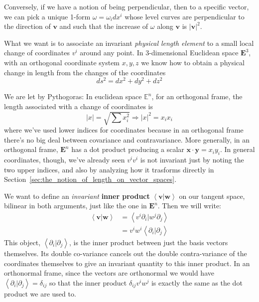 \documentclass[../master.tex]{subfiles}
\begin{document}
	Conversely, if we have a notion of being perpendicular, then to a specific vector, we can pick a unique 1-form $\omega = \omega_i dx^i$ whose level curves are perpendicular to the direction of $\mathbf v$ and such that the increase of $\omega$ along $\mathbf v$ is $|\mathbf v|^2$.
	
	What we want is to associate an invariant \emph{physical length element} to a small local change of coordinates $v^i$ around any point. In 3-dimensional Euclidean space $\mathbf E^3$, with an orthogonal coordinate system $x,y,z$ we know how to obtain a physical change in length from the changes of the coordinates
	\begin{equation}
		ds^2 = dx^2 + dy^2 + dz^2
	\end{equation}
	
	
	
	We are let by Pythogoras: In euclidean space $\mathbb E^n$, for an orthogonal frame, the length associated with a change of coordinates is 
	\begin{equation}
		|x| = \sqrt{\sum x_i^2} \Rightarrow |x|^2 = x_i x_i
	\end{equation}
	where we've used lower indices for coordinates because in an orthogonal frame there's no big deal between covariance and contravariance. More generally, in an orthogonal frame, $\mathbf E^n$ has a dot product producing a scalar $\mathbf x \cdot \mathbf y = x_i y_i$. 
	In general coordinates, though, we've already seen $v^i v^i$ is not invariant just by noting the two upper indices, and also by analyzing how it trasforms directly in Section~\ref{sec:the_notion_of_length_on_vector_spaces}. 
	
	We want to define an \emph{invariant} \textbf{inner product} $\left< \mathbf v | \mathbf w \right>$ on our tangent space, bilinear in both arguments, just like the one in $\mathbf E^n$. Then we will write:
	\begin{equation}
		\begin{aligned}
			\left< \mathbf v | \mathbf w \right> &= \left< v^i \partial_i | w^j \partial_j \right> \\
			&= v^i w^i \left< \partial_i | \partial_j \right>
		\end{aligned}
	\end{equation}
	This object, $\left< \partial_i | \partial_j \right>$, is the inner product between just the basis vectors themselves. Its double co-variance cancels out the double contra-variance of the coordinates themselves to give an invariant quantity to this inner product. In an orthonormal frame, since the vectors are orthonormal we would have $\left< \partial_i | \partial_j \right> = \delta_{ij}$ so that the inner product $\delta_{ij} v^i w^j$ is exactly the same as the dot product we are used to. 
	
\end{document}

